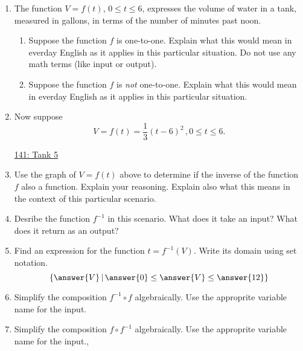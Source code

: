 \documentclass{ximera}
\begin{document}
\begin{example} \label{Ex1:Quadratics}

\begin{enumerate}
\item The function $V=f(t)$, $0\leq t \leq 6$, expresses the volume of water in a tank, measured in gallons, in terms of the number of minutes past noon. 

\begin{enumerate}
\item Suppose the function $f$ is one-to-one. Explain what this would mean in everday English as it applies in this particular situation. Do not use any math terms (like input or output).

\item Suppose the function $f$ is \emph{not} one-to-one. Explain what this would mean in everday English as it applies in this particular situation. %

\end{enumerate}

\item Now suppose 
\[
     V = f(t) = \frac{1}{3}(t-6)^2 \, , 0\leq t \leq 6 .
\]

\begin{onlineOnly}
    \begin{center}
\end{center}
\end{onlineOnly}

\href{https://www.desmos.com/calculator/ef7obzoxx3}{141: Tank 5}

\item Use the graph of $V=f(t)$ above to determine if the inverse of the function $f$ also a function. Explain your reasoning. Explain also what this means in the context of this particular scenario.

\item Desribe the function $f^{-1}$ in this scenario. What does it take an input? What does it return as an output?

\item Find an expression for the function $t = f^{-1}(V)$. Write its domain using set notation.
\[
      \{ \answer{V} \, | \, \answer{0} \leq \answer{V} \leq \answer{12} \}
\]

\item Simplify the composition $f^{-1}\circ f$ algebraically. Use the approprite variable name for the input.

\item  Simplify the composition $f\circ f^{-1}$ algebraically. Use the approprite variable name for the input.,

\end{enumerate}

\end{example}
\end{document}
